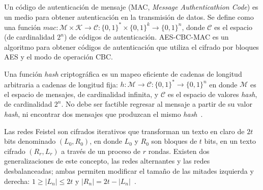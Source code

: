 Un código de autenticación de mensaje (MAC, \textit{Message Authenticathion
Code}) es un medio para obtener autenticación en la transmisión de datos. Se
define como una función $ mac: \mathcal{M} \times \mathcal{K} \rightarrow
\mathcal{C} : \{ 0, 1 \}^* \times \{ 0, 1 \}^k \rightarrow \{ 0, 1 \}^n $,
donde $ \mathcal{C} $ es el espacio (de cardinalidad $ 2^n $) de códigos de
autenticación. AES-CBC-MAC es un algoritmo para obtener códigos de autenticación
que utiliza el cifrado por bloques AES y el modo de operación CBC.

Una función \textit{hash} criptográfica es un mapeo eficiente de cadenas de
longitud arbitraria a cadenas de longitud fija: $ h: \mathcal{M} \rightarrow
\mathcal{C} : \{ 0, 1 \}^* \rightarrow \{ 0, 1 \}^n $ en donde $ \mathcal{M} $
es el espacio de mensajes, de cardinalidad infinita, y $ \mathcal{C} $ es el
espacio de valores \textit{hash}, de cardinalidad $ 2^n $. No debe ser factible
regresar al mensaje a partir de su valor \textit{hash}, ni encontrar dos
mensajes que produzcan el mismo \textit{hash}~\cite{menezes}.


Las redes Feistel son cifrados iterativos que transforman un texto en claro de $
2t $ bits denominado $ (L_0, R_0) $, en donde $ L_0 $ y $ R_0 $ son bloques de $
t $ bits, en un texto cifrado $ (R_r, L_r) $ a través de un proceso de $ r $
rondas. Existen dos generalizaciones de este concepto, las redes alternantes y
las redes desbalanceadas; ambas permiten modificar el tamaño de las mitades
izquierda y derecha: $ 1 \geq | L_n | \leq 2t $ y $ | R_n | = 2t - | L_n |
$~\cite{DBLP:conf/fse/SchneierK96, DBLP:conf/fse/AndersonB96a}.


